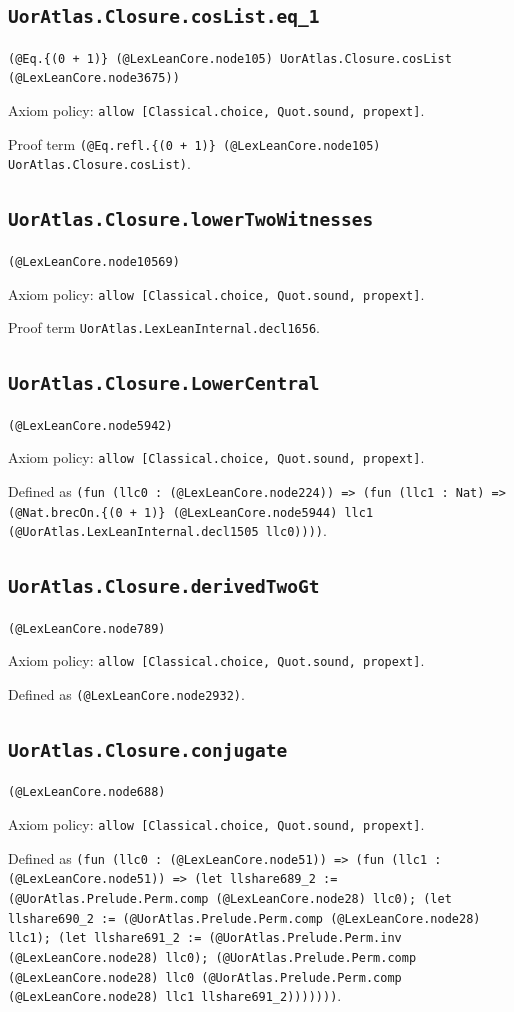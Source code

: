 \documentclass[11pt]{article}
\begin{document}
\subsection*{\texttt{UorAtlas.Closure.cosList.eq\_1}}
\noindent\texttt{(@Eq.\{(0 + 1)\} (@LexLeanCore.node105) UorAtlas.Closure.cosList (@LexLeanCore.node3675))}\par
\noindent Axiom policy: \texttt{allow [Classical.choice, Quot.sound, propext]}.\par
\noindent Proof term \texttt{(@Eq.refl.\{(0 + 1)\} (@LexLeanCore.node105) UorAtlas.Closure.cosList)}.\par
\subsection*{\texttt{UorAtlas.Closure.lowerTwoWitnesses}}
\noindent\texttt{(@LexLeanCore.node10569)}\par
\noindent Axiom policy: \texttt{allow [Classical.choice, Quot.sound, propext]}.\par
\noindent Proof term \texttt{UorAtlas.LexLeanInternal.decl1656}.\par
\subsection*{\texttt{UorAtlas.Closure.LowerCentral}}
\noindent\texttt{(@LexLeanCore.node5942)}\par
\noindent Axiom policy: \texttt{allow [Classical.choice, Quot.sound, propext]}.\par
\noindent Defined as \texttt{(fun (llc0 : (@LexLeanCore.node224)) => (fun (llc1 : Nat) => (@Nat.brecOn.\{(0 + 1)\} (@LexLeanCore.node5944) llc1 (@UorAtlas.LexLeanInternal.decl1505 llc0))))}.\par
\subsection*{\texttt{UorAtlas.Closure.derivedTwoGt}}
\noindent\texttt{(@LexLeanCore.node789)}\par
\noindent Axiom policy: \texttt{allow [Classical.choice, Quot.sound, propext]}.\par
\noindent Defined as \texttt{(@LexLeanCore.node2932)}.\par
\subsection*{\texttt{UorAtlas.Closure.conjugate}}
\noindent\texttt{(@LexLeanCore.node688)}\par
\noindent Axiom policy: \texttt{allow [Classical.choice, Quot.sound, propext]}.\par
\noindent Defined as \texttt{(fun (llc0 : (@LexLeanCore.node51)) => (fun (llc1 : (@LexLeanCore.node51)) => (let llshare689\_2 := (@UorAtlas.Prelude.Perm.comp (@LexLeanCore.node28) llc0); (let llshare690\_2 := (@UorAtlas.Prelude.Perm.comp (@LexLeanCore.node28) llc1); (let llshare691\_2 := (@UorAtlas.Prelude.Perm.inv (@LexLeanCore.node28) llc0); (@UorAtlas.Prelude.Perm.comp (@LexLeanCore.node28) llc0 (@UorAtlas.Prelude.Perm.comp (@LexLeanCore.node28) llc1 llshare691\_2)))))))}.\par
\end{document}
